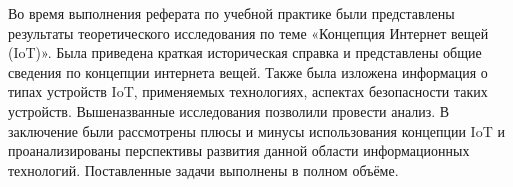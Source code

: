 Во время выполнения реферата по учебной практике были представлены результаты теоретического исследования по теме «Концепция Интернет вещей (IoT)». Была приведена краткая историческая справка и представлены общие сведения по концепции интернета вещей. Также была изложена информация о типах устройств IoT, применяемых технологиях, аспектах безопасности таких устройств. Вышеназванные исследования позволили провести анализ. В заключение были рассмотрены плюсы и минусы использования концепции IoT и проанализированы перспективы развития данной области информационных технологий. Поставленные задачи выполнены в полном объёме.
